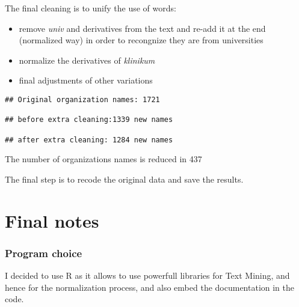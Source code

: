 \documentclass[]{article}
\providecommand{\tightlist}{%
  \setlength{\itemsep}{0pt}\setlength{\parskip}{0pt}}
\begin{document}
The final cleaning is to unify the use of words:

\begin{itemize}
\tightlist
\item
  remove \textit{univ} and derivatives from the text and re-add it at the end
  (normalized way) in order to recongnize they are from universities
\item
  normalize the derivatives of \textit{klinikum}
\item
  final adjustments of other variations
\end{itemize}



\begin{verbatim}
## Original organization names: 1721

## before extra cleaning:1339 new names

## after extra cleaning: 1284 new names

\end{verbatim}

The number of organizations names is reduced in 437


The final step is to recode the original data and save the results.

\hypertarget{final-notes}{%
\section{Final notes}\label{final-notes}}

\hypertarget{program-choice}{%
\subsubsection{Program choice}\label{program-choice}}

I decided to use R as it allows to use powerfull libraries for Text
Mining, and hence for the normalization process, and also embed the
documentation in the code.
\end{document}
